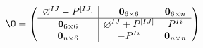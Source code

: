 \begin{equation}
\O=\left(\begin{array}{c|c c}\o^{IJ}-P^{[IJ]}&{\bf 0}_{6 \times
6} &{\bf 0}_{6 \times n}\cr\hline {\bf 0}_{6 \times 6}&
\o^{IJ}+P^{[IJ]}&P^{Ii}\cr {\bf 0}_{n \times 6}& -P^{Ii} &{\bf
0}_{n \times n}\end{array}\right)
\end{equation}

